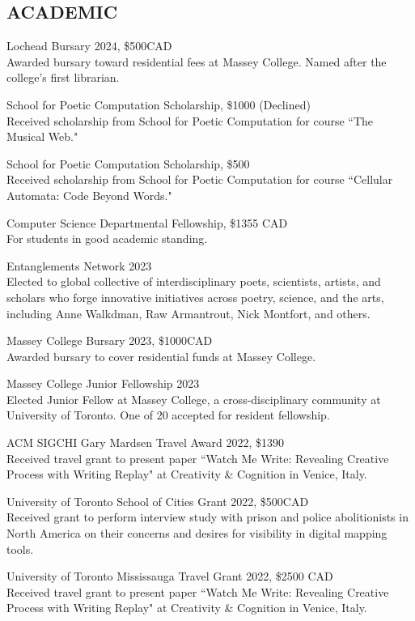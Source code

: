  \subsection{ACADEMIC}
 
Lochead Bursary 2024, \$500CAD \\
Awarded bursary toward residential fees at Massey College. Named after the college's first librarian.
 
 School for Poetic Computation Scholarship, \$1000 (Declined) \\
Received scholarship from School for Poetic Computation for course ``The Musical Web."
 
School for Poetic Computation Scholarship, \$500  \\
Received scholarship from School for Poetic Computation for course ``Cellular Automata: Code Beyond Words."
 
Computer Science Departmental Fellowship, \$1355 CAD \\
For students in good academic standing. 
 
Entanglements Network 2023 \\
 Elected to global collective of interdisciplinary poets, scientists, artists, and scholars who forge innovative initiatives across poetry, science, and the arts, including Anne Walkdman, Raw Armantrout, Nick Montfort, and others. 

Massey College Bursary 2023, \$1000CAD \\
Awarded bursary to cover residential funds at Massey College. 

Massey College Junior Fellowship 2023 \\
 Elected Junior Fellow at Massey College, a cross-disciplinary community at University of Toronto. One of 20 accepted for resident fellowship.  
 
 ACM SIGCHI Gary Mardsen Travel Award 2022, \$1390  \\
Received travel grant to present paper ``Watch Me Write: Revealing Creative Process with Writing Replay" at Creativity \& Cognition in Venice, Italy.
 
University of Toronto School of Cities Grant 2022, \$500CAD \\
Received grant to perform interview study with prison and police abolitionists in North America on their concerns and desires for visibility in digital mapping tools.

University of Toronto Mississauga Travel Grant 2022, \$2500 CAD \\
Received travel grant to present paper ``Watch Me Write: Revealing Creative Process with Writing Replay" at Creativity \& Cognition in Venice, Italy.

